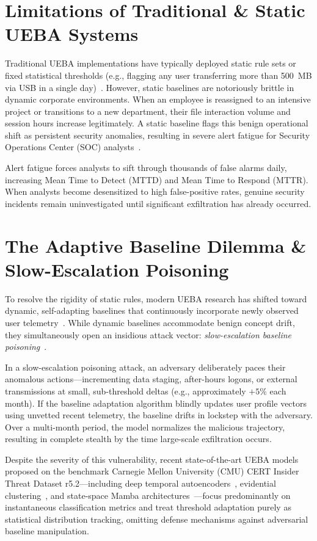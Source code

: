 \documentclass[12pt,a4paper]{report}
\begin{document}
\section{Limitations of Traditional \& Static UEBA Systems}
Traditional UEBA implementations have typically deployed static rule sets or fixed statistical thresholds (e.g., flagging any user transferring more than 500~MB via USB in a single day)~\cite{yadav2025artificial}. However, static baselines are notoriously brittle in dynamic corporate environments. When an employee is reassigned to an intensive project or transitions to a new department, their file interaction volume and session hours increase legitimately. A static baseline flags this benign operational shift as persistent security anomalies, resulting in severe alert fatigue for Security Operations Center (SOC) analysts~\cite{cyberhaven2024anomaly}. 

Alert fatigue forces analysts to sift through thousands of false alarms daily, increasing Mean Time to Detect (MTTD) and Mean Time to Respond (MTTR). When analysts become desensitized to high false-positive rates, genuine security incidents remain uninvestigated until significant exfiltration has already occurred.

\section{The Adaptive Baseline Dilemma \& Slow-Escalation Poisoning}
To resolve the rigidity of static rules, modern UEBA research has shifted toward dynamic, self-adapting baselines that continuously incorporate newly observed user telemetry~\cite{song2024britd, bamashmoos2025adaptive, kong2026mambaitd}. While dynamic baselines accommodate benign concept drift, they simultaneously open an insidious attack vector: \textit{slow-escalation baseline poisoning}~\cite{kloft2012security, biggio2018wild}.

In a slow-escalation poisoning attack, an adversary deliberately paces their anomalous actions---incrementing data staging, after-hours logons, or external transmissions at small, sub-threshold deltas (e.g., approximately $+5\%$ each month). If the baseline adaptation algorithm blindly updates user profile vectors using unvetted recent telemetry, the baseline drifts in lockstep with the adversary. Over a multi-month period, the model normalizes the malicious trajectory, resulting in complete stealth by the time large-scale exfiltration occurs.

Despite the severity of this vulnerability, recent state-of-the-art UEBA models proposed on the benchmark Carnegie Mellon University (CMU) CERT Insider Threat Dataset r5.2---including deep temporal autoencoders~\cite{song2024britd}, evidential clustering~\cite{ali2025realtime}, and state-space Mamba architectures~\cite{kong2026mambaitd}---focus predominantly on instantaneous classification metrics and treat threshold adaptation purely as statistical distribution tracking, omitting defense mechanisms against adversarial baseline manipulation.
\end{document}
